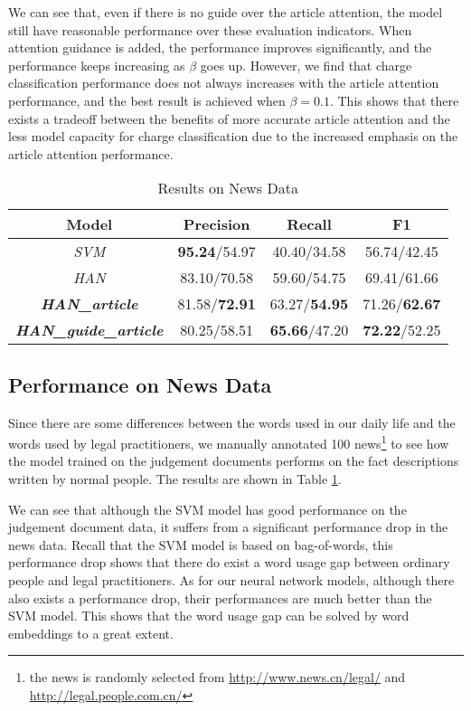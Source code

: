 We can see that, even if there is no guide over the article attention, the model still have reasonable performance over these evaluation indicators. When attention guidance is added, the performance improves significantly, and the performance keeps increasing as $\beta$ goes up. However, we find that charge classification performance does not always increases with the article attention performance, and the best result is achieved when $\beta=0.1$. This shows that there exists a tradeoff between the benefits of more accurate article attention and the less model capacity for charge classification due to the increased emphasis on the article attention performance.

\begin{table}
\centering
\small{
\begin{tabular}{|c|c|c|c|}
\hline
\textbf{Model}				& \textbf{Precision} 				& \textbf{Recall} 				& \textbf{F1} 	\\
\hline
\textit{SVM} 				& \textbf{95.24}/54.97			& 40.40/34.58  					& 56.74/42.45 				 	\\
\hline
\textit{HAN}				& 83.10/70.58					& 59.60/54.75  					& 69.41/61.66					\\
\hline
\textbf{\textit{HAN\_article}}			& 81.58/\textbf{72.91}			& 63.27/\textbf{54.95} 			& 71.26/\textbf{62.67}					\\
\hline
\textbf{\textit{HAN\_guide\_article}} 	& 80.25/58.51 					& \textbf{65.66}/47.20 			& \textbf{72.22}/52.25 		 	\\
\hline
\end{tabular}
}
\caption{Results on News Data}
\label{tabble_news_results}
\end{table}

\subsection{Performance on News Data}
Since there are some differences between the words used in our daily life and the words used by legal practitioners, we manually annotated 100 news\footnote{the news is randomly selected from \url{http://www.news.cn/legal/} and \url{http://legal.people.com.cn/}} to see how the model trained on the judgement documents performs on the fact descriptions written by normal people. The results are shown in Table \ref{tabble_news_results}.

We can see that although the SVM model has good performance on the judgement document data, it suffers from a significant performance drop in the news data. Recall that the SVM model is based on bag-of-words, this performance drop shows that there do exist a word usage gap between ordinary people and legal practitioners. As for our neural network models, although there also exists a performance drop, their performances are much better than the SVM model. This shows that the word usage gap can be solved by word embeddings to a great extent. 

